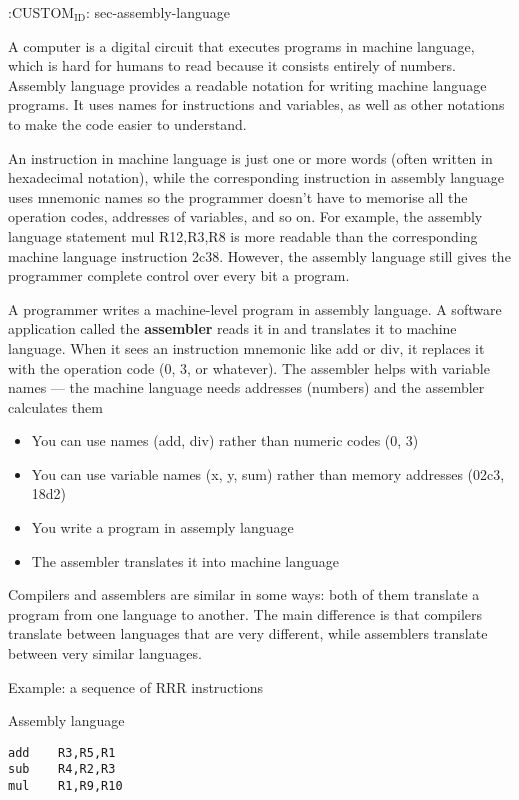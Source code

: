 \documentclass[11pt]{article}
\begin{document}
:CUSTOM\(_{\text{ID}}\): sec-assembly-language

A computer is a digital circuit that executes programs in machine
language, which is hard for humans to read because it consists
entirely of numbers.  Assembly language provides a readable notation
for writing machine language programs.  It uses names for instructions
and variables, as well as other notations to make the code easier to
understand.

An instruction in machine language is just one or more words (often
written in hexadecimal notation), while the corresponding instruction
in assembly language uses mnemonic names so the programmer doesn't
have to memorise all the operation codes, addresses of variables, and
so on. For example, the assembly language statement mul R12,R3,R8 is
more readable than the corresponding machine language instruction
2c38.  However, the assembly language still gives the programmer
complete control over every bit a program.


A programmer writes a machine-level program in assembly language.  A
software application called the \textbf{assembler} reads it in and translates
it to machine language.  When it sees an instruction mnemonic like add
or div, it replaces it with the operation code (0, 3, or whatever).
The assembler helps with variable names --- the machine language needs
addresses (numbers) and the assembler calculates them

\begin{itemize}
\item You can use names (add, div) rather than numeric codes (0, 3)
\item You can use variable names (x, y, sum) rather than memory addresses
(02c3, 18d2)
\item You write a program in assemply language
\item The assembler translates it into machine language
\end{itemize}

Compilers and assemblers are similar in some ways: both of them
translate a program from one language to another.  The main difference
is that compilers translate between languages that are very different,
while assemblers translate between very similar languages.

Example: a sequence of RRR instructions

Assembly language
\begin{verbatim}
add    R3,R5,R1
sub    R4,R2,R3
mul    R1,R9,R10   
\end{verbatim}
\end{document}
